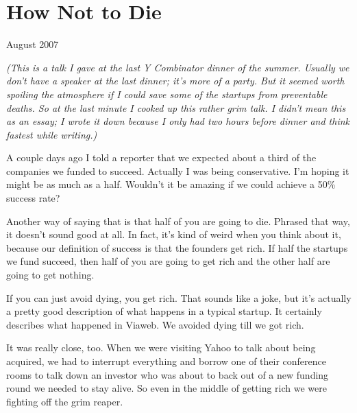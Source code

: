 \chapter{How Not to Die}


            
              
                


                  
                    August 2007

\emph{(This is a talk I gave at the last Y Combinator dinner of
                      the summer. Usually we don't have a speaker at the last
                      dinner; it's more of a party. But it seemed worth spoiling
                      the atmosphere if I could save some of the startups from
                      preventable deaths. So at the last minute I cooked up this
                      rather grim talk. I didn't mean this as an essay; I wrote
                      it down because I only had two hours before dinner and
                      think fastest while writing.) }

A couple days ago I told a reporter that we
                    expected about a third of the companies we funded to
                    succeed. Actually I was being conservative. I'm hoping it
                    might be as much as a half. Wouldn't it be amazing if we
                    could achieve a 50\% success rate?

Another way of
                    saying that is that half of you are going to die. Phrased
                    that way, it doesn't sound good at all. In fact, it's kind
                    of weird when you think about it, because our definition of
                    success is that the founders get rich. If half the startups
                    we fund succeed, then half of you are going to get rich and
                    the other half are going to get nothing.

If you
                    can just avoid dying, you get rich. That sounds like a joke,
                    but it's actually a pretty good description of what happens
                    in a typical startup. It certainly describes what happened
                    in Viaweb. We avoided dying till we got rich.

It
                    was really close, too. When we were visiting Yahoo to talk
                    about being acquired, we had to interrupt everything and
                    borrow one of their conference rooms to talk down an
                    investor who was about to back out of a new funding round we
                    needed to stay alive. So even in the middle of getting rich
                    we were fighting off the grim reaper.

